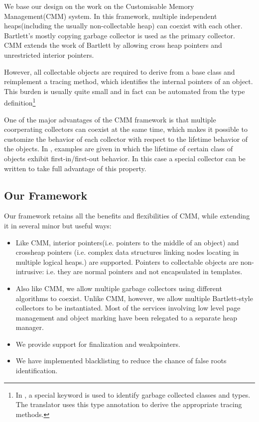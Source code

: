 
   We base our design on the work on the Customisable Memory Management(CMM)
system\cite{CMM}.  In this framework, multiple independent heaps(including
the usually non-collectable heap) can coexist with each other.
Bartlett's mostly copying garbage collector is used as the primary collector.
CMM extends the work of Bartlett\cite{Mostly-copying} 
by allowing cross heap pointers and unrestricted interior pointers.

  However, all collectable objects are required to derive from a base class 
and reimplement a tracing method, which identifies the internal pointers of 
an object.  This burden is usually quite small and in fact can be
automated from the type definition\footnote{In \Prop, a special keyword
 is used to identify garbage collected classes and types.
The \Prop{} translator uses this type annotation to derive the appropriate  
tracing methods.}

  One of the major advantages of the CMM framework is that multiple
coorperating collectors can coexist at the same time, which makes it
possible to customize the behavior of each collector with respect to
the lifetime behavior of the objects.  In \cite{CMM}, examples are
given in which the lifetime of certain class of objects exhibit
first-in/first-out behavior.  In this case a special collector can be
written to take full advantage of this property.

\subsection{Our Framework}
   Our framework retains all the benefits and flexibilities of CMM, 
while extending it in several minor but useful ways:  
\begin{itemize}
   \item Like CMM, interior pointers(i.e. pointers to the middle of an object)
and crossheap pointers (i.e. complex data structures linking nodes locating
in multiple logical heaps.) are supported.  Pointers to collectable
objects are non-intrusive: i.e. they are normal \Cpp{} pointers 
and not encapsulated in templates.
   \item Also like CMM, we allow multiple garbage collectors using different
algorithms to coexist.  Unlike CMM, however, we allow multiple 
Bartlett-style collectors to be instantiated.  Most of the services 
involving low level page management and object marking have been relegated
to a separate heap manager.   
   \item We provide support for finalization and weakpointers.
   \item We have implemented blacklisting\cite{Boehm} to reduce the chance
of false roots identification.
\end{itemize}

